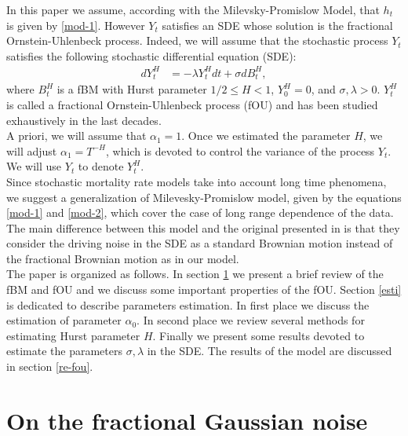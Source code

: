 \documentclass[smallextended]{svjour3}
\begin{document}
In this paper we assume, according with the Milevsky-Promislow Model, that
$h_t$ is given by
\eqref{mod-1}. However $Y_t$ satisfies an SDE whose solution is the fractional
Ornstein-Uhlenbeck process. Indeed,
we will assume that the stochastic process $Y_t$ satisfies the following
stochastic differential
equation (SDE):
\begin{align}
dY_t^H&=-\lambda Y_t^Hdt+\sigma dB_t^H,  \label{mod-2}
\end{align}
where $B_t^H $ is a fBM with Hurst parameter $1/2 \le H< 1$, $Y_0^H=0$, and
$\sigma,\lambda> 0$.
$Y_t^H$ is called a fractional Ornstein-Uhlenbeck process (fOU) and has been
studied exhaustively
in the last decades. \\


A priori, we will assume that $\alpha_1=1$. Once we estimated the parameter
$H$, we will
adjust $\alpha_1=T^{-H}$, which is devoted to control the variance of the
process $Y_t$.
We will use $Y_t$ to denote $Y_t^H$.\\

Since stochastic mortality rate models take into account long time phenomena, we
suggest a generalization of Milevesky-Promislow model, given by the equations
\eqref{mod-1} and \eqref{mod-2}, which cover the case of long range dependence
of
the data.\\

The main difference between this model and the original presented
in \cite{mi-pr} is that they consider the driving noise in the SDE as a standard
Brownian motion instead of the fractional Brownian motion as in our model.\\



The paper is organized as follows. In section \ref{fgn} we present a brief
review of
the fBM and fOU and we discuss some important properties of the fOU. Section
\ref{esti}
is dedicated to describe parameters estimation.
In first place we discuss the estimation of parameter $\alpha_0$. In second
place we review several
methods for estimating  Hurst parameter
$H$. Finally we present some results devoted to estimate the parameters
$\sigma,\lambda$ in the SDE. The results of the
model are discussed in section \ref{re-fou}.\\


\section{On the fractional Gaussian noise}
\label{fgn}
\end{document}
